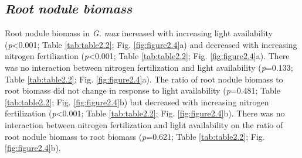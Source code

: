 \subsection{\textit{Root nodule biomass}}
\noindent Root nodule biomass in \textit{G. max} increased with increasing light availability (\textit{p}<0.001; Table \ref{tab:table2.2}; Fig. \ref{fig:figure2.4}a) and decreased with increasing nitrogen fertilization (\textit{p}<0.001; Table \ref{tab:table2.2}; Fig. \ref{fig:figure2.4}a). There was no interaction between nitrogen fertilization and light availability (\textit{p}=0.133; Table \ref{tab:table2.2}; Fig. \ref{fig:figure2.4}a). The ratio of root nodule biomass to root biomass did not change in response to light availability (\textit{p}=0.481; Table \ref{tab:table2.2}; Fig. \ref{fig:figure2.4}b) but decreased with increasing nitrogen fertilization (\textit{p}<0.001; Table \ref{tab:table2.2}; Fig. \ref{fig:figure2.4}b). There was no interaction between nitrogen fertilization and light availability on the ratio of root nodule biomass to root biomass (\textit{p}=0.621; Table \ref{tab:table2.2}; Fig. \ref{fig:figure2.4}b).

